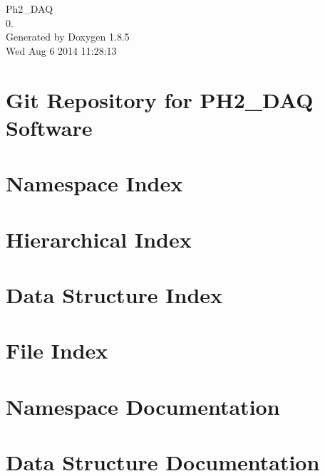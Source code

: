 \documentclass[twoside]{book}
\newcommand{\clearemptydoublepage}{%
  \newpage{\pagestyle{empty}\cleardoublepage}%
}
\begin{document}
\hypersetup{pageanchor=false}
\begin{titlepage}
\vspace*{7cm}
\begin{center}%
{\Large Ph2\-\_\-\-D\-A\-Q \\[1ex]\large 0. }\\
\vspace*{1cm}
{\large Generated by Doxygen 1.8.5}\\
\vspace*{0.5cm}
{\small Wed Aug 6 2014 11:28:13}\\
\end{center}
\end{titlepage}
\clearemptydoublepage
\tableofcontents
\clearemptydoublepage
{}
\hypersetup{pageanchor=true}

\chapter{Git Repository for P\-H2\-\_\-\-D\-A\-Q Software}
\label{md__r_e_a_d_m_e}
\hypertarget{md__r_e_a_d_m_e}{}

\chapter{Namespace Index}

\chapter{Hierarchical Index}

\chapter{Data Structure Index}

\chapter{File Index}

\chapter{Namespace Documentation}


\chapter{Data Structure Documentation}













\end{document}
